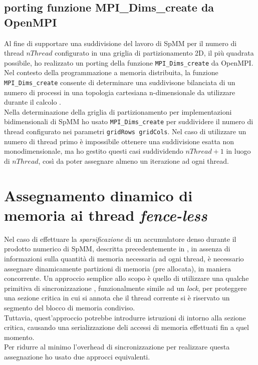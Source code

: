 \subsection{porting funzione MPI\_Dims\_create da OpenMPI}	\label{ompiDimsCreate}
Al fine di supportare una suddivisione del lavoro di SpMM per il numero di thread $nThread$ configurato
in una griglia di partizionamento 2D, il più quadrata possibile, ho realizzato un porting della 
funzione \verb|MPI_Dims_create| da OpenMPI.
\voidLine
Nel contesto della programmazione a memoria distribuita, 
la funzione \\ \verb|MPI_Dims_create| consente di determinare una suddivisone bilanciata di un numero di processi in una topologia 
cartesiana n-dimensionale da utilizzare durante il calcolo \cite{mpi}.\\
Nella determinazione della griglia di partizionamento per implementazioni bidimensionali di SpMM ho usato 
\verb|MPI_Dims_create| per suddividere il numero di thread configurato nei parametri \verb|gridRows gridCols|.
Nel caso di utilizzare un numero di thread primo è impossibile ottenere una suddivisione esatta non monodimensionale,
ma ho gestito questi casi suddividendo $nThread+1$ in luogo di $nThread$, 
così da poter assegnare almeno un iterazione ad ogni thread.\\


\section{Assegnamento dinamico di memoria ai thread \emph{fence-less}} \label{chSpMMAux:atomicSegAssign}
Nel caso di effettuare la \emph{sparsificazione} di un accumulatore denso 
durante il prodotto numerico di SpMM, descritta precedentemente in ,
in assenza di informazioni sulla quantità di memoria necessaria ad ogni thread, 
è necessario assegnare dinamicamente partizioni di memoria (pre allocata), in maniera concorrente.
\voidLine
Un approccio semplice allo scopo è quello di utilizzare una qualche primitiva di sincronizzazione
, funzionalmente simile ad un \emph{lock}, per proteggere una sezione critica in cui
si annota che il thread corrente si è riservato un segmento del blocco di memoria condiviso.\\
Tuttavia, quest'approccio potrebbe introdurre istruzioni di  intorno alla sezione critica,
causando una serializzazione deli accessi di memoria effettuati fin a quel momento.\\
Per ridurre al minimo l'overhead di sincronizzazione per realizzare questa assegnazione
ho usato due approcci equivalenti.

